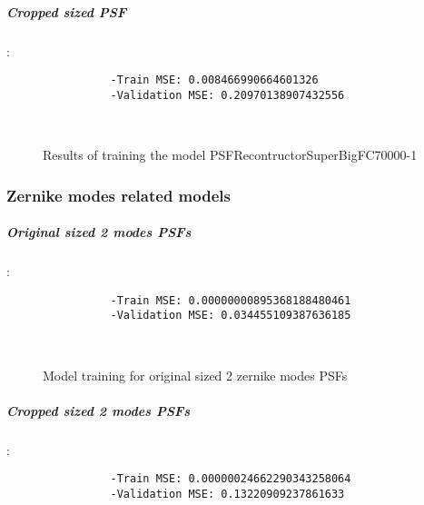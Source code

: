 		\subparagraph{Cropped sized PSF}:\\
		\begin{lstlisting}	
        		-Train MSE: 0.008466990664601326
        		-Validation MSE: 0.20970138907432556
		\end{lstlisting}
		
		\begin{figure*}[ht!]
			\hspace{\fill}
			\hspace{\fill}
			\\
			\caption{Results of training the model PSFRecontructorSuperBigFC70000-1}
		\end{figure*}
	
\FloatBarrier
	\subsubsection{Zernike modes related models}
		\subparagraph{Original sized 2 modes PSFs}:\\
		\begin{lstlisting}	
        		-Train MSE: 0.00000000895368188480461
        		-Validation MSE: 0.034455109387636185
		\end{lstlisting}
		
		\begin{figure*}[ht!]
			\hspace{\fill}
			\hspace{\fill}
			\\
			\caption{Model training for original sized 2 zernike modes PSFs}
		\end{figure*}
		\FloatBarrier
		
		\subparagraph{Cropped sized 2 modes PSFs}:\\
		\begin{lstlisting}	
        		-Train MSE: 0.00000024662290343258064
        		-Validation MSE: 0.13220909237861633
		\end{lstlisting}
		
